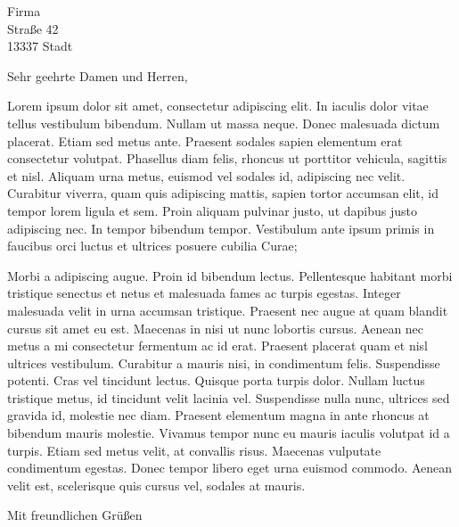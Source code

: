 \documentclass[a4paper]{dinbrief}
\begin{document}
\begin{letter}{Firma \\ Straße 42 \\[\medskipamount] 13337 Stadt}
\subject{\bfseries Lorem ipsum}


\opening{Sehr geehrte Damen und Herren,}

Lorem ipsum dolor sit amet, consectetur adipiscing elit. In iaculis dolor vitae tellus vestibulum bibendum. Nullam ut massa neque. Donec malesuada dictum placerat. Etiam sed metus ante. Praesent sodales sapien elementum erat consectetur volutpat. Phasellus diam felis, rhoncus ut porttitor vehicula, sagittis et nisl. Aliquam urna metus, euismod vel sodales id, adipiscing nec velit. Curabitur viverra, quam quis adipiscing mattis, sapien tortor accumsan elit, id tempor lorem ligula et sem. Proin aliquam pulvinar justo, ut dapibus justo adipiscing nec. In tempor bibendum tempor. Vestibulum ante ipsum primis in faucibus orci luctus et ultrices posuere cubilia Curae;

Morbi a adipiscing augue. Proin id bibendum lectus. Pellentesque habitant morbi tristique senectus et netus et malesuada fames ac turpis egestas. Integer malesuada velit in urna accumsan tristique. Praesent nec augue at quam blandit cursus sit amet eu est. Maecenas in nisi ut nunc lobortis cursus. Aenean nec metus a mi consectetur fermentum ac id erat. Praesent placerat quam et nisl ultrices vestibulum. Curabitur a mauris nisi, in condimentum felis. Suspendisse potenti. Cras vel tincidunt lectus. Quisque porta turpis dolor. Nullam luctus tristique metus, id tincidunt velit lacinia vel. Suspendisse nulla nunc, ultrices sed gravida id, molestie nec diam. Praesent elementum magna in ante rhoncus at bibendum mauris molestie. Vivamus tempor nunc eu mauris iaculis volutpat id a turpis. Etiam sed metus velit, at convallis risus. Maecenas vulputate condimentum egestas. Donec tempor libero eget urna euismod commodo. Aenean velit est, scelerisque quis cursus vel, sodales at mauris.


\closing{Mit freundlichen Grüßen}
\end{letter}
\end{document}
